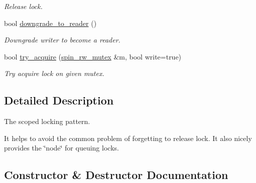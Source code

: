 \begin{DoxyCompactItemize}
\begin{DoxyCompactList}\small\item\em Release lock. \end{DoxyCompactList}\item 
\hypertarget{classtbb_1_1spin__rw__mutex_1_1scoped__lock_a9028aeeeca09e2964e197297988df9f2}{}bool \hyperlink{classtbb_1_1spin__rw__mutex_1_1scoped__lock_a9028aeeeca09e2964e197297988df9f2}{downgrade\+\_\+to\+\_\+reader} ()\label{classtbb_1_1spin__rw__mutex_1_1scoped__lock_a9028aeeeca09e2964e197297988df9f2}

\begin{DoxyCompactList}\small\item\em Downgrade writer to become a reader. \end{DoxyCompactList}\item 
\hypertarget{classtbb_1_1spin__rw__mutex_1_1scoped__lock_aed236c523ea40e19212f7f5c0b7db166}{}bool \hyperlink{classtbb_1_1spin__rw__mutex_1_1scoped__lock_aed236c523ea40e19212f7f5c0b7db166}{try\+\_\+acquire} (\hyperlink{classtbb_1_1spin__rw__mutex}{spin\+\_\+rw\+\_\+mutex} \&m, bool write=true)\label{classtbb_1_1spin__rw__mutex_1_1scoped__lock_aed236c523ea40e19212f7f5c0b7db166}

\begin{DoxyCompactList}\small\item\em Try acquire lock on given mutex. \end{DoxyCompactList}\end{DoxyCompactItemize}


\subsection{Detailed Description}
The scoped locking pattern. 

It helps to avoid the common problem of forgetting to release lock. It also nicely provides the \char`\"{}node\char`\"{} for queuing locks. 

\subsection{Constructor \& Destructor Documentation}
\hypertarget{classtbb_1_1spin__rw__mutex_1_1scoped__lock_a65696273b99d103d52067f648c7cf781}{}
